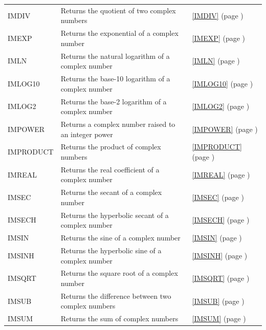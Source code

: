 \begin{center}
\begin{longtable}{l l l }
		IMDIV & Returns the quotient of two complex numbers &  \ref{IMDIV} (page \pageref{IMDIV}) \index{Spreadsheet Functions!IMDIV} \\
		IMEXP & Returns the exponential of a complex number &  \ref{IMEXP} (page \pageref{IMEXP}) \index{Spreadsheet Functions!IMEXP} \\
		IMLN  & Returns the natural logarithm of a complex number &  \ref{IMLN} (page \pageref{IMLN}) \index{Spreadsheet Functions!IMLN} \\
		IMLOG10 & Returns the base-10 logarithm of a complex number &  \ref{IMLOG10} (page \pageref{IMLOG10}) \index{Spreadsheet Functions!IMLOG10} \\
		IMLOG2 & Returns the base-2 logarithm of a complex number &  \ref{IMLOG2} (page \pageref{IMLOG2}) \index{Spreadsheet Functions!IMLOG2} \\
		IMPOWER & Returns a complex number raised to an integer power &  \ref{IMPOWER} (page \pageref{IMPOWER}) \index{Spreadsheet Functions!IMPOWER} \\
		IMPRODUCT & Returns the product of complex numbers &  \ref{IMPRODUCT} (page \pageref{IMPRODUCT}) \index{Spreadsheet Functions!IMPRODUCT} \\
		IMREAL & Returns the real coefficient of a complex number &  \ref{IMREAL} (page \pageref{IMREAL}) \index{Spreadsheet Functions!IMREAL} \\
		
		IMSEC & Returns the  secant of a complex number &  \ref{IMSEC} (page \pageref{IMSEC}) \index{Spreadsheet Functions!IMSEC} \\
		IMSECH & Returns the hyperbolic secant of a complex number &  \ref{IMSECH} (page \pageref{IMSECH}) \index{Spreadsheet Functions!IMSECH} \\
		
		IMSIN & Returns the sine of a complex number &  \ref{IMSIN} (page \pageref{IMSIN}) \index{Spreadsheet Functions!IMSIN} \\
		IMSINH & Returns the hyperbolic sine of a complex number &  \ref{IMSINH} (page \pageref{IMSINH}) \index{Spreadsheet Functions!IMSINH} \\
		
		
		IMSQRT & Returns the square root of a complex number &  \ref{IMSQRT} (page \pageref{IMSQRT}) \index{Spreadsheet Functions!IMSQRT} \\
		IMSUB & Returns the difference between two complex numbers &  \ref{IMSUB} (page \pageref{IMSUB}) \index{Spreadsheet Functions!IMSUB} \\
		IMSUM & Returns the sum of complex numbers &  \ref{IMSUM} (page \pageref{IMSUM}) \index{Spreadsheet Functions!IMSUM} \\
		

\end{longtable}
\end{center}
